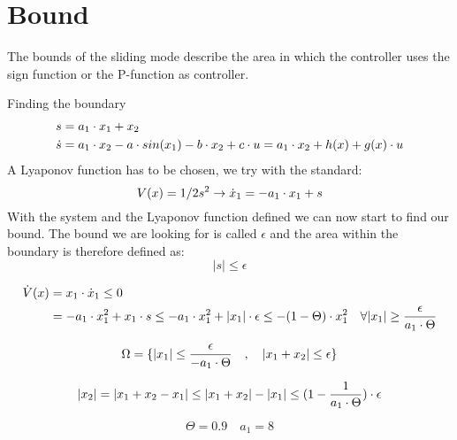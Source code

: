 \section{Bound} %
\label{sec:bound}
The bounds of the sliding mode describe the area in which the controller uses the sign function or the P-function as controller.

Finding the boundary
\begin{equation}
\begin{split}
        s &= a_1 \cdot x_1 + x_2 \\
        \dot{s} &= a_1 \cdot x_2 - a \cdot sin(x_1) - b \cdot x_2 + c \cdot u = a_1 \cdot x_2 + h(x) + g(x) \cdot u
\end{split}
\end{equation}
A Lyaponov function has to be chosen, we try with the standard:
\begin{equation}
        V(x) = 1/2 s^2 \rightarrow \dot{x}_1 = -a_1 \cdot x_1 + s
\end{equation}
With the system and the Lyaponov function defined we can now start to find our bound. The bound we are looking for is called $\epsilon$ and the area within the boundary is therefore defined as:
\begin{equation}
        \vert s \vert \leq \epsilon
\end{equation}

\begin{equation}
        \begin{split}
                \dot{V}(x) &= x_1 \cdot \dot{x}_1 \leq 0 \\
                &= -a_1 \cdot x_1^2 + x_1 \cdot s \leq -a_1 \cdot x_1^2 + |x_1| \cdot \epsilon \leq -(1-\Theta) \cdot x_1^2 \quad \forall |x_1| \geq \frac{\epsilon}{a_1 \cdot \Theta}
        \end{split}
\end{equation}

\begin{equation}
        \Omega = \{ |x_1| \leq \frac{\epsilon}{-a_1 \cdot \Theta} \quad , \quad |x_1 + x_2| \leq \epsilon \}
\end{equation}

\begin{equation}
        |x_2| = |x_1 + x_2 - x_1| \leq |x_1 + x_2| - |x_1| \leq (1 - \frac{1}{a_1 \cdot \Theta}) \cdot \epsilon
\end{equation}

\begin{equation}
        \Theta = 0.9 \quad a_1 = 8
\end{equation}


